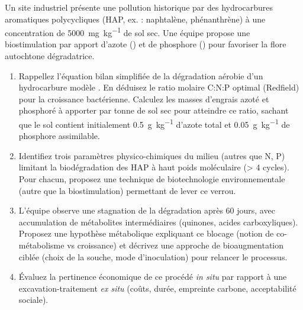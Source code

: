 \documentclass[11pt]{article}
\begin{document}
\begin{exercice}
Un site industriel présente une pollution historique par des hydrocarbures aromatiques polycycliques (HAP, ex. : naphtalène, phénanthrène) à une concentration de \SI{5000}{mg.kg^{-1}} de sol sec. Une équipe propose une biostimulation par apport d'azote () et de phosphore () pour favoriser la flore autochtone dégradatrice.
\begin{enumerate}
    \item Rappellez l'équation bilan simplifiée de la dégradation aérobie d'un hydrocarbure modèle . En déduisez le ratio molaire C:N:P optimal (Redfield) pour la croissance bactérienne. Calculez les masses d'engrais azoté et phosphoré à apporter par tonne de sol sec pour atteindre ce ratio, sachant que le sol contient initialement \SI{0.5}{g.kg^{-1}} d'azote total et \SI{0.05}{g.kg^{-1}} de phosphore assimilable.
    \item Identifiez trois paramètres physico-chimiques du milieu (autres que N, P) limitant la biodégradation des HAP à haut poids moléculaire (> 4 cycles). Pour chacun, proposez une technique de biotechnologie environnementale (autre que la biostimulation) permettant de lever ce verrou.
    \item L'équipe observe une stagnation de la dégradation après 60 jours, avec accumulation de métabolites intermédiaires (quinones, acides carboxyliques). Proposez une hypothèse métabolique expliquant ce blocage (notion de co-métabolisme vs croissance) et décrivez une approche de bioaugmentation ciblée (choix de la souche, mode d'inoculation) pour relancer le processus.
    \item Évaluez la pertinence économique de ce procédé \textit{in situ} par rapport à une excavation-traitement \textit{ex situ} (coûts, durée, empreinte carbone, acceptabilité sociale).
\end{enumerate}
\end{exercice}
\end{document}
